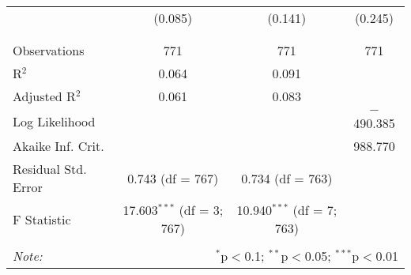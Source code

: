 \begin{table}[!htbp]
\begin{tabular}{@{\extracolsep{5pt}}lccc}
  & (0.085) & (0.141) & (0.245) \\ 
  & & & \\ 
\hline \\[-1.8ex] 
Observations & 771 & 771 & 771 \\ 
R$^{2}$ & 0.064 & 0.091 &  \\ 
Adjusted R$^{2}$ & 0.061 & 0.083 &  \\ 
Log Likelihood &  &  & $-$490.385 \\ 
Akaike Inf. Crit. &  &  & 988.770 \\ 
Residual Std. Error & 0.743 (df = 767) & 0.734 (df = 763) &  \\ 
F Statistic & 17.603$^{***}$ (df = 3; 767) & 10.940$^{***}$ (df = 7; 763) &  \\ 
\hline 
\hline \\[-1.8ex] 
\textit{Note:}  & \multicolumn{3}{r}{$^{*}$p$<$0.1; $^{**}$p$<$0.05; $^{***}$p$<$0.01} \\ 
\end{tabular} 
\end{table} 
